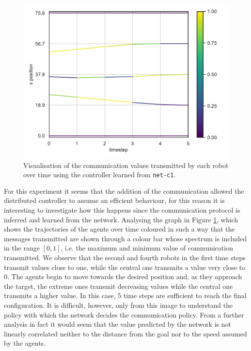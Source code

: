 \begin{figure}[!htb]
	\centering
	\includegraphics[width=.65\textwidth]{contents/images/net-c1/0/plot-simulation-communication-0}
	\vspace{-0.5cm}
	\caption[Evaluation of the communication learned by 
	\texttt{net-c1}.]{Visualisation of the communication values transmitted by each 
		robot over time using the controller learned from \texttt{net-c1}.}	
	\label{fig:net-c1comm}
\end{figure}
For this experiment it seems that the addition of the communication allowed the 
distributed controller to assume an efficient behaviour, for this reason it is 
interesting to investigate how this happens since the communication protocol is 
inferred and learned from the network.
Analysing the graph in Figure \ref{fig:net-c1comm}, which shows the trajectories 
of the agents over time coloured in such a way that the messages transmitted are 
shown through a colour bar whose spectrum is included in the range $[0, 1]$, i.e. 
the maximum and minimum value of communication transmitted. 
We observe that the second and fourth robots in the first time steps transmit 
values close to one, while the central one transmits a value very close to 0. 
The agents begin to move towards the desired position and, as they approach the 
target, the extreme ones transmit decreasing values while the central one 
transmits a higher value. In this case, 5 time steps are sufficient to reach the final 
configuration.
It is difficult, however, only from this image to understand the policy with which 
the network decides the communication policy.
From a further analysis in fact it would seem that the value predicted by the 
network is not linearly correlated neither to the distance from the goal nor to the 
speed assumed by the agents.

